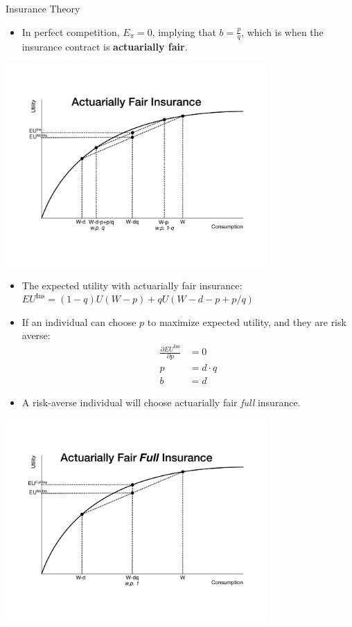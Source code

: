 \documentclass[10pt]{extarticle}
\begin{document}
\begin{problem}{Insurance Theory}
\begin{itemize}
      \item In perfect competition, $E_{\pi} = 0$, implying that $b = \frac{p}{q}$, which is when the insurance contract is \textbf{actuarially fair}.
    \end{itemize}
    \begin{center}
      \includegraphics[width=10cm]{images/insurance_expected_utility.pdf}
    \end{center}
    \begin{itemize}
      \item The expected utility with actuarially fair insurance: $EU^{\text{Ins}} = (1-q)U(W-p) + qU(W-d-p+p/q)$
      \item If an individual can choose $p$ to maximize expected utility, and they are risk averse:
        \begin{align*}
          \frac{\partial EU^{\text{Ins}}}{\partial p} &= 0\\
          p &= d\cdot q \tag*{Premium = Expected Damage}\\
          b &= d \tag*{Benefit = Damage}
        \end{align*}
      \item A risk-averse individual will choose actuarially fair \textit{full} insurance.
    \end{itemize}
    \begin{center}
      \includegraphics[width=10cm]{images/full_insurance_expected_utility.pdf}

\end{center}
\end{problem}
\end{document}

